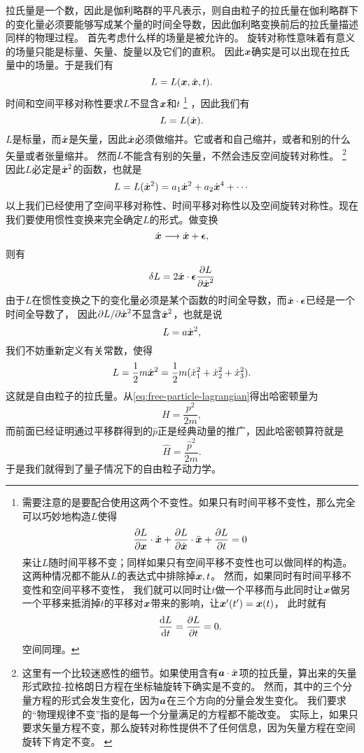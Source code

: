 \documentclass[hyperref, UTF8, a4paper]{ctexart}
\begin{document}
拉氏量是一个数，因此是伽利略群的平凡表示，则自由粒子的拉氏量在伽利略群下的变化量必须要能够写成某个量的时间全导数，因此伽利略变换前后的拉氏量描述同样的物理过程。
首先考虑什么样的场量是被允许的。
旋转对称性意味着有意义的场量只能是标量、矢量、旋量以及它们的直积。
因此$\vb*{x}$确实是可以出现在拉氏量中的场量。于是我们有
\[
    L = L(\vb*{x}, \dot{\vb*{x}}, t).
\]
时间和空间平移对称性要求$L$不显含$\vb*{x}$和$t$%
\footnote{需要注意的是要配合使用这两个不变性。如果只有时间平移不变性，那么完全可以巧妙地构造$L$使得
\[
    \pdv{L}{\vb*{x}} \cdot \dot{\vb*{x}} + \pdv{L}{\dot{\vb*{x}}} \cdot \ddot{\vb*{x}} + \pdv{L}{t} = 0
\]
来让$L$随时间平移不变；同样如果只有空间平移不变性也可以做同样的构造。
这两种情况都不能从$L$的表达式中排除掉$\vb*{x}, t$。
然而，如果同时有时间平移不变性和空间平移不变性，
我们就可以同时让$t$做一个平移而与此同时让$\vb*{x}$做另一个平移来抵消掉$t$的平移对$\vb*{x}$带来的影响，让$\vb*{x}'(t')=\vb*{x}(t)$，
此时就有
\[
    \dv{L}{t} = \pdv{L}{t} = 0.
\]
空间同理。
}%
，因此我们有
\[
    L = L(\dot{\vb*{x}}).
\]
$L$是标量，而$\dot{\vb*{x}}$是矢量，因此$\dot{\vb*{x}}$必须做缩并。它或者和自己缩并，或者和别的什么矢量或者张量缩并。
然而$L$不能含有别的矢量，不然会违反空间旋转对称性。%
\footnote{
    这里有一个比较迷惑性的细节。如果使用含有$\vb*{a} \cdot \hat{\vb*{x}}$项的拉氏量，算出来的矢量形式欧拉-拉格朗日方程在坐标轴旋转下确实是不变的。
    然而，其中的三个分量方程的形式会发生变化，因为$\vb*{a}$在三个方向的分量会发生变化。
    我们要求的“物理规律不变”指的是每一个分量满足的方程都不能改变。
    实际上，如果只要求矢量方程不变，那么旋转对称性提供不了任何信息，因为矢量方程在空间旋转下肯定不变。
    \label{note:rotation}
}%
因此$L$必定是$\dot{\vb*{x}}^2$的函数，也就是
\[
    L = L(\dot{\vb*{x}}^2) = a_1 \dot{\vb*{x}}^2 + a_2 \dot{\vb*{x}}^4 + \cdots
\]
以上我们已经使用了空间平移对称性、时间平移对称性以及空间旋转对称性。现在我们要使用惯性变换来完全确定$L$的形式。做变换
\[
    \dot{\vb*{x}} \longrightarrow \dot{\vb*{x}} + \vb*{\epsilon},
\]
则有
\[
    \var{L} = 2 \dot{\vb*{x}} \cdot \vb*{\epsilon} \pdv{L}{\dot{\vb*{x}}^2}
\]
由于$L$在惯性变换之下的变化量必须是某个函数的时间全导数，而$\dot{\vb*{x}} \cdot \vb*{\epsilon}$已经是一个时间全导数了，
因此$\partial L / \partial \dot{\vb*{x}}^2$不显含$\dot{\vb*{x}}^2$，也就是说
\[
    L = a \dot{\vb*{x}}^2,
\]
我们不妨重新定义有关常数，使得
\begin{equation}
    L = \frac{1}{2} m \dot{\vb*{x}}^2 = \frac{1}{2} m (\dot{x}_1^2 + \dot{x}_2^2 + \dot{x}_3^2).
    \label{eq:free-particle-lagrangian}
\end{equation}
这就是自由粒子的拉氏量。从\eqref{eq:free-particle-lagrangian}得出哈密顿量为
\[
    H = \frac{p^2}{2m},
\]
而前面已经证明通过平移群得到的$\hat{p}$正是经典动量的推广，因此哈密顿算符就是
\begin{equation}
    \hat{H} = \frac{\hat{p}^2}{2m}.
\end{equation}
于是我们就得到了量子情况下的自由粒子动力学。
\end{document}
